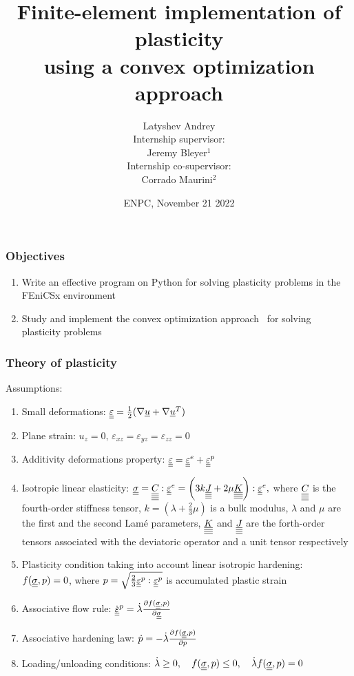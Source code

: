 \documentclass[9pt]{beamer}
\title{Finite-element implementation of plasticity \\ using a convex optimization approach}
\author[Latyshev A.]{ {\Large Latyshev Andrey} \\ [10mm]{\small Internship supervisor: \\ Jeremy Bleyer$^1$ \newline\\ Internship co-supervisor: \\ Corrado Maurini$^2$}  }
\institute[Navier Laboratoiry]{$^1$Navier laboratory  \\$^2$Sorbonne University}
\date{ENPC, November 21 2022}
\begin{document}
\frame{\titlepage}

\begin{frame}
  \frametitle{Objectives}
  \begin{enumerate}
    \item Write an effective program on Python for solving plasticity problems in the FEniCSx environment 
    \item Study and implement the convex optimization approach~ for solving plasticity problems
  \end{enumerate}
\end{frame}

\begin{frame}
  \frametitle{Theory of plasticity}

  Assumptions:
  \begin{enumerate}
    \item Small deformations: $\underline{\underline{\varepsilon}} = \frac{1}{2}(\nabla\underline{u} + \nabla\underline{u}^T)$
    \item Plane strain: $u_z = 0, \, \varepsilon_{xz} = \varepsilon_{yz} = \varepsilon_{zz} = 0$
    \item Additivity deformations property: $\underline{\underline{\varepsilon}} = \underline{\underline{\varepsilon}}^e + \underline{\underline{\varepsilon}}^p$
    \item Isotropic linear elasticity: $\underline{\underline{\sigma}} = \underline{\underline{\underline{\underline{C_{}}}}} : \underline{\underline{\varepsilon}}^e = \left( 3k\underline{\underline{\underline{\underline{J}}}} + 2\mu\underline{\underline{\underline{\underline{K}}}} \right) : \underline{\underline{\varepsilon}}^e,$ where $\underline{\underline{\underline{\underline{C_{}}}}}$ is the fourth-order stiffness tensor, $k = (\lambda + \frac{2}{3}\mu)$ is a bulk modulus, $\lambda$ and $\mu$ are the first and the second Lamé parameters, $\underline{\underline{\underline{\underline{K}}}}$ and $\underline{\underline{\underline{\underline{J}}}}$ are the forth-order tensors associated with the deviatoric operator and a unit tensor respectively
    \item Plasticity condition taking into account linear isotropic hardening: $f(\underline{\underline{\sigma}}, p) = 0$, where $p = \sqrt{\frac{2}{3}\underline{\underline{\varepsilon}}^p : \underline{\underline{\varepsilon}}^p}$ is accumulated plastic strain
    \item Associative flow rule: $\dot{\underline{\underline{\varepsilon}}}^p = \dot{\lambda} \frac{\partial f(\underline{\underline{\sigma}}, p)}{\partial \underline{\underline{\sigma}}}$
    \item Associative hardening law: $\dot{p} = -\dot{\lambda}\frac{\partial f(\underline{\underline{\sigma}}, p)}{\partial p}$
    \item Loading/unloading conditions: $\dot{\lambda} \geq 0, \quad f(\underline{\underline{\sigma}}, p) \leq 0, \quad \dot{\lambda}f(\underline{\underline{\sigma}}, p) = 0$
  \end{enumerate}
\end{frame}
\end{document}
